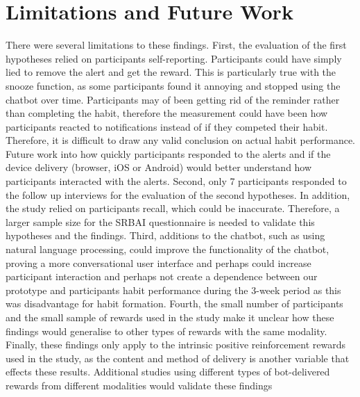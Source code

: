 
\section{Limitations and Future Work} \label{limitations_and_future_work}
There were several limitations to these findings. First, the evaluation of the first hypotheses relied on participants self-reporting. Participants could have simply lied to remove the alert and get the reward. This is particularly true with the snooze function, as some participants found it annoying and stopped using the chatbot over time. Participants may of been getting rid of the reminder rather than completing the habit, therefore the measurement could have been how participants reacted to notifications instead of if they competed their habit. Therefore, it is difficult to draw any valid conclusion on actual habit performance. Future work into how quickly participants responded to the alerts and if the device delivery (browser, iOS or Android) would better understand how participants interacted with the alerts. Second, only 7 participants responded to the follow up interviews for the evaluation of the second hypotheses. In addition, the study relied on participants recall, which could be inaccurate. Therefore, a larger sample size for the SRBAI questionnaire is needed to validate this hypotheses and the findings. Third, additions to the chatbot, such as using natural language processing, could improve the functionality of the chatbot, proving a more conversational user interface and perhaps could increase participant interaction and perhaps not create a dependence between our prototype and participants habit performance during the 3-week period as this was disadvantage for habit formation. Fourth, the small number of participants and the small sample of rewards used in the study make it unclear how these findings would generalise to other types of rewards with the same modality. Finally, these findings only apply to the intrinsic positive reinforcement rewards used in the study, as the content and method of delivery is another variable that effects these results. Additional studies using different types of bot-delivered rewards from different modalities would validate these findings

\newpage

